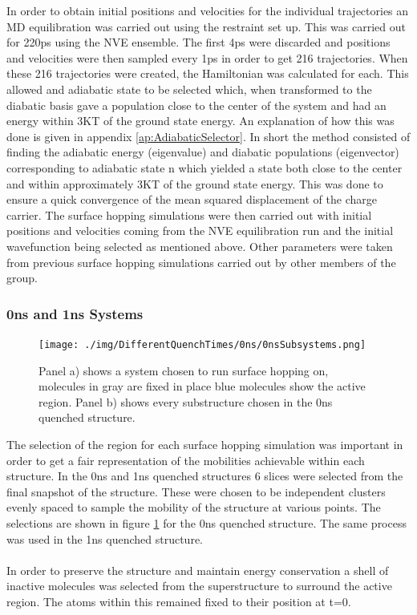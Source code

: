 In order to obtain initial positions and velocities for the individual trajectories an MD equilibration was carried out using the restraint set up. This was carried out for 220ps using the NVE ensemble. The first 4ps were discarded and positions and velocities were then sampled every 1ps in order to get 216 trajectories. When these 216 trajectories were created, the Hamiltonian was calculated for each. This allowed and adiabatic state to be selected which, when transformed to the diabatic basis gave a population close to the center of the system and had an energy within 3KT of the ground state energy. An explanation of how this was done is given in appendix \ref{ap:AdiabaticSelector}. In short the method consisted of finding the adiabatic energy (eigenvalue) and diabatic populations (eigenvector) corresponding to adiabatic state n which yielded a state both close to the center and within approximately 3KT of the ground state energy. This was done to ensure a quick convergence of the mean squared displacement of the charge carrier. The surface hopping simulations were then carried out with initial positions and velocities coming from the NVE equilibration run and the initial wavefunction being selected as mentioned above. Other parameters were taken from previous surface hopping simulations carried out by other members of the group.

\subsubsection{0ns and 1ns Systems}
\begin{figure}[ht]
	\texttt{[image: ./img/DifferentQuenchTimes/0ns/0nsSubsystems.png]}
	\caption{\label{fig:0nsSubSys}Panel a) shows a system chosen to run surface hopping on, molecules in gray are fixed in place blue molecules show the active region. Panel b) shows every substructure chosen in the 0ns quenched structure.}
\end{figure}
The selection of the region for each surface hopping simulation was important in order to get a fair representation of the mobilities achievable within each structure. In the 0ns and 1ns quenched structures 6 slices were selected from the final snapshot of the structure. These were chosen to be independent clusters evenly spaced to sample the mobility of the structure at various points. The selections are shown in figure \ref{fig:0nsSubSys} for the 0ns quenched structure. The same process was used in the 1ns quenched structure.
\\\\
In order to preserve the structure and maintain energy conservation a shell of inactive molecules was selected from the superstructure to surround the active region. The atoms within this remained fixed to their position at t=0.
